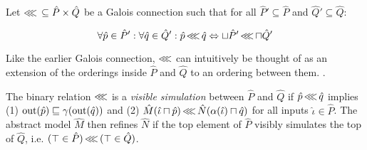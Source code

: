 



Let $\operatorname{\lll} \, \subseteq \hat P \times \hat Q$ be a Galois connection such that for all $\hat P' \subseteq \hat P$ and $\hat Q' \subseteq \hat Q$:

\begin{equation*}
\forall \hat p \in \hat P' : \forall \hat q \in \hat Q' : \hat p \operatorname{\lll} \hat q \Leftrightarrow \sqcup \hat P' \operatorname{\lll} \sqcap \hat Q'
\end{equation*}

\noindent Like the earlier Galois connection, $\operatorname{\lll}$ can intuitively be thought of as an extension of the orderings inside $\hat P$ and $\hat Q$ to an ordering between them. .

The binary relation $\operatorname{\lll}$ is a \textit{visible simulation} between $\hat P$ and $\hat Q$ if $\hat p \operatorname{\lll} \hat q$ implies (1) $\operatorname{out}(\hat p) \sqsubseteq \gamma(\operatorname{out}(\hat q))$ and (2) $\hat M(\hat \iota \sqcap \hat p) \operatorname{\lll} \hat N(\alpha(\hat \iota) \sqcap \hat q)$ for all inputs $\hat \iota \in \hat P$. The abstract model $\hat M$ then refines $\hat N$ if the top element of $\hat P$ visibly simulates the top of $\hat Q$, i.e. $(\top \in \hat P) \operatorname{\lll} \, (\top \in \hat Q)$.


